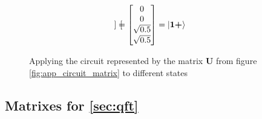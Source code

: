 \begin{figure}[H]
\begin{alignat*}{2}
\begin{bmatrix}
        \end{bmatrix}
        =
        \begin{bmatrix}
            0             \\
            0             \\
            \sqrt{0.5}    \\
            \sqrt{0.5}    \\
        \end{bmatrix}&=\ket{\mathbf{1}\textbf{+}}
    \end{alignat*}
    \caption{Applying the circuit represented by the matrix $\mathbf{U}$ from figure \ref{fig:app_circuit_matrix} to different states}
    \label{fig:app_applying_circuit}
\end{figure}
\subsection{Matrixes for \ref{sec:qft}}
\tiny
